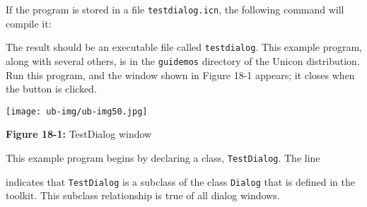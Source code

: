 

\noindent If the program is stored in a file
\texttt{testdialog.icn},
the following command will compile it:


\noindent The result should be an executable file called
\texttt{testdialog}.  This example program, along with several
others, is in the \texttt{guidemos} directory of the Unicon
distribution. Run this program, and the window shown in Figure 18-1
appears; it closes when the button is clicked.

\begin{center}
\texttt{[image: ub-img/ub-img50.jpg]}
\end{center}

{\sffamily\bfseries Figure 18-1:}
{\sffamily TestDialog window}

\bigskip

This example program begins by
declaring a class, \texttt{TestDialog}. The line


\noindent
indicates that \texttt{TestDialog} is a subclass of the
class \texttt{Dialog} that is defined in the toolkit. This subclass
relationship is true of all dialog windows.

